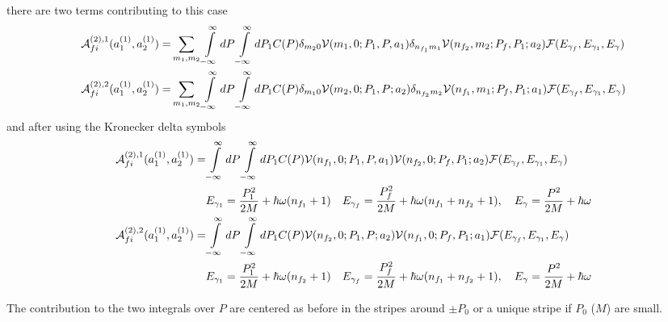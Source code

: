 there are two terms contributing to this case
\begin{align}
  {\cal A}_{fi}^{(2),1}(a_1^{(1)}, a_2^{(1)}) = & \sum\limits_{m_1,m_2}\int\limits_{-\infty}^{\infty}dP\int\limits_{-\infty}^{\infty}dP_1 C(P)\delta_{m_20}{\cal V}(m_1,0;P_1,P,a_1)\delta_{n_{f_1}m_1}{\cal V}(n_{f_2},m_2;P_f,P_1;a_2){\cal F}(E_{\gamma_f},E_{\gamma_1},E_\gamma)\nonumber\\
  {\cal A}_{fi}^{(2),2}(a_1^{(1)}, a_2^{(1)}) = & \sum\limits_{m_1,m_2}\int\limits_{-\infty}^{\infty}dP\int\limits_{-\infty}^{\infty}dP_1 C(P)\delta_{m_10}{\cal V}(m_2,0;P_1,P;a_2)\delta_{n_{f_2}m_2}{\cal V}(n_{f_1},m_1;P_f,P_1;a_1){\cal F}(E_{\gamma_f},E_{\gamma_1},E_\gamma)
\end{align}
and after using the Kronecker delta symbols
\begin{align}
  {\cal A}_{fi}^{(2),1}(a_1^{(1)}, a_2^{(1)}) = & \int\limits_{-\infty}^{\infty}dP\int\limits_{-\infty}^{\infty}dP_1 C(P){\cal V}(n_{f_1},0;P_1,P,a_1){\cal V}(n_{f_2},0;P_f,P_1;a_2){\cal F}(E_{\gamma_f},E_{\gamma_1},E_\gamma)\nonumber\\
  &E_{\gamma_1}=\frac{P_1^2}{2M} + \hbar\omega(n_{f_1}+1)\quad E_{\gamma_f} =\frac{P_f^2}{2M} + \hbar\omega(n_{f_1}+n_{f_2}+1),\quad E_\gamma = \frac{P^2}{2M} + \hbar\omega\\
  {\cal A}_{fi}^{(2),2}(a_1^{(1)}, a_2^{(1)}) =&\int\limits_{-\infty}^{\infty}dP\int\limits_{-\infty}^{\infty}dP_1 C(P){\cal V}(n_{f_2},0;P_1,P;a_2){\cal V}(n_{f_1},0;P_f,P_1;a_1){\cal F}(E_{\gamma_f},E_{\gamma_1},E_\gamma)\nonumber\\
  &E_{\gamma_1}=\frac{P_1^2}{2M} + \hbar\omega(n_{f_2}+1)\quad E_{\gamma_f} =\frac{P_f^2}{2M} + \hbar\omega(n_{f_1}+n_{f_2}+1),\quad E_\gamma = \frac{P^2}{2M} + \hbar\omega
\end{align}

The contribution to the two integrals over $P$ are centered as before in the stripes around $\pm P_0$ or a unique stripe if $P_0$ ($M$) are small.